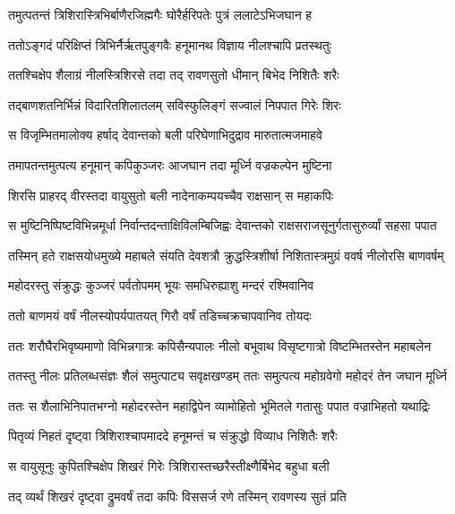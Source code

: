 \twolineshloka
{तमुत्पतन्तं त्रिशिरास्त्रिभिर्बाणैरजिह्मगैः}
{घोरैर्हरिपतेः पुत्रं ललाटेऽभिजघान ह} %

\twolineshloka
{ततोऽङ्गदं परिक्षिप्तं त्रिभिर्नैर्ऋतपुङ्गवैः}
{हनूमानथ विज्ञाय नीलश्चापि प्रतस्थतुः} %

\twolineshloka
{ततश्चिक्षेप शैलाग्रं नीलस्त्रिशिरसे तदा}
{तद् रावणसुतो धीमान् बिभेद निशितैः शरैः} %

\twolineshloka
{तद्बाणशतनिर्भिन्नं विदारितशिलातलम्}
{सविस्फुलिङ्गं सज्वालं निपपात गिरेः शिरः} %

\twolineshloka
{स विजृम्भितमालोक्य हर्षाद् देवान्तको बली}
{परिघेणाभिदुद्राव मारुतात्मजमाहवे} %

\twolineshloka
{तमापतन्तमुत्पत्य हनूमान् कपिकुञ्जरः}
{आजघान तदा मूर्ध्नि वज्रकल्पेन मुष्टिना} %

\twolineshloka
{शिरसि प्राहरद् वीरस्तदा वायुसुतो बली}
{नादेनाकम्पयच्चैव राक्षसान् स महाकपिः} %

\twolineshloka
{स मुष्टिनिष्पिष्टविभिन्नमूर्धा निर्वान्तदन्ताक्षिविलम्बिजिह्वः}
{देवान्तको राक्षसराजसूनुर्गतासुरुर्व्यां सहसा पपात} %

\twolineshloka
{तस्मिन् हते राक्षसयोधमुख्ये महाबले संयति देवशत्रौ}
{क्रुद्धस्त्रिशीर्षा निशितास्त्रमुग्रं ववर्ष नीलोरसि बाणवर्षम्} %

\twolineshloka
{महोदरस्तु संक्रुद्धः कुञ्जरं पर्वतोपमम्}
{भूयः समधिरुह्याशु मन्दरं रश्मिवानिव} %

\twolineshloka
{ततो बाणमयं वर्षं नीलस्योपर्यपातयत्}
{गिरौ वर्षं तडिच्चक्रचापवानिव तोयदः} %

\twolineshloka
{ततः शरौघैरभिवृष्यमाणो विभिन्नगात्रः कपिसैन्यपालः}
{नीलो बभूवाथ विसृष्टगात्रो विष्टम्भितस्तेन महाबलेन} %

\twolineshloka
{ततस्तु नीलः प्रतिलब्धसंज्ञः शैलं समुत्पाट्य सवृक्षखण्डम्}
{ततः समुत्पत्य महोग्रवेगो महोदरं तेन जघान मूर्ध्नि} %

\twolineshloka
{ततः स शैलाभिनिपातभग्नो महोदरस्तेन महाद्विपेन}
{व्यामोहितो भूमितले गतासुः पपात वज्राभिहतो यथाद्रिः} %

\twolineshloka
{पितृव्यं निहतं दृष्ट्वा त्रिशिराश्चापमाददे}
{हनूमन्तं च संक्रुद्धो विव्याध निशितैः शरैः} %

\twolineshloka
{स वायुसूनुः कुपितश्चिक्षेप शिखरं गिरेः}
{त्रिशिरास्तच्छरैस्तीक्ष्णैर्बिभेद बहुधा बली} %

\twolineshloka
{तद् व्यर्थं शिखरं दृष्ट्वा द्रुमवर्षं तदा कपिः}
{विससर्ज रणे तस्मिन् रावणस्य सुतं प्रति} %

